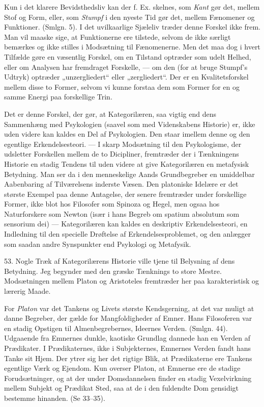 \documentclass[12pt,a4paper]{book}
\newcommand{\opage}[1]{\marginnote{\footnotesize\textit{[#1]}}}
\begin{document}
Kun i det klarere Bevidsthedsliv kan der f. Ex. skelnes, som \emph{Kant}
gør det, mellem Stof og Form, eller, som \emph{Stumpf} i den nyeste Tid
gør det, mellem Fænomener og Funktioner. (Smlgn. 5). I det
uvilkaarlige Sjæleliv træder denne Forskel ikke frem. Man vil maaske
sige, at Funktionerne ere tilstede, selvom de ikke særligt bemærkes og
ikke stilles i Modsætning til Fænomenerne. Men det maa dog i hvert
Tilfælde gøre en væsentlig Forskel, om en Tilstand optræder som udelt
Helhed, eller om Analysen har fremdraget Forskelle, --- om den (for at
bruge Stumpf's Udtryk) optræder „unzergliedert“ eller „zergliedert“. Der
er en Kvalitetsforskel mellem disse to Former, selvom vi kunne forstaa
dem som Former for en og samme Energi paa forskellige Trin.

Det er denne Forskel, der gør, at Kategorilæren, saa vigtig end dens
Sammenhæng med Psykologien (saavel som med Videnskabens Historie) er,
ikke uden videre kan kaldes en Del af Psykologien. Den staar imellem
denne og den egentlige Erkendelsesteori. --- I skarp Modsætning til den
Psykologisme, der udsletter Forskellen mellem de to Dicipliner,
fremtræder der i Tænkningens Historie en stadig Tendens til uden videre
at give Kategorilæren en metafysisk Betydning. Man ser da i den
menneskelige Aands Grundbegreber en umiddelbar Aabenbaring af
Tilværelsens inderste Væsen. \opage{140} Den platoniske Idelære er det største
Exempel paa denne Antagelse, der senere fremtræder under forskellige
Former, ikke blot hos Filosofer som Spinoza og Hegel, men ogsaa hos
Naturforskere som Newton (især i hans Begreb om spatium absolutum som
sensorium dei) --- Kategorilæren kan kaldes en deskriptiv
Erkendelsesteori, en Indledning til den specielle Drøftelse af
Erkendelsesproblemet, og den anlægger som saadan andre Synspunkter end
Psykologi og Metafysik.

53. Nogle Træk af Kategorilærens Historie ville tjene til Belysning af
dens Betydning. Jeg begynder med den græske Tænknings to store Mestre.
Modsætningen mellem Platon og Aristoteles fremtræder her paa
karakteristisk og lærerig Maade.

For \emph{Platon} var det Tankens og Livets største Kendsgerning, at det
var muligt at danne Begreber, der gælde for Mangfoldigheder af Emner.
Hans Filosoferen var en stadig Opstigen til Almenbegrebernes, Ideernes
Verden. (Smlgn. 44). Udgaaende fra Emnernes dunkle, kaotiske Grundlag
dannede han en Verden af Prædikater. I Prædikaternes, ikke i Subjekternes, Emnernes Verden fandt hans Tanke sit Hjem. Der ytrer sig her det
rigtige Blik, at Prædikaterne ere Tankens egentlige Værk og Ejendom. Kun
overser Platon, at Emnerne ere de stadige Forudsætninger, og at der under
Domsdannelsen finder en stadig Vexelvirkning mellem Subjekt og Prædikat
Sted, saa at de i den fuldendte Dom gensidigt bestemme hinanden. (Se
33--35).
\end{document}
